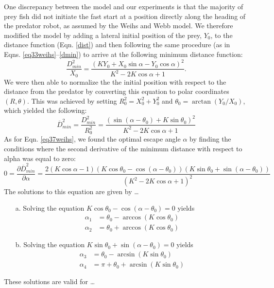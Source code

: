 \documentclass[12pt]{article}
\def\ds{\displaystyle}
\def\d{\partial}
\newcommand{\ol}{\overline}
\begin{document}
One discrepancy between the model and our experiments is that the majority of prey fish did not initiate the fast start at a position directly along the heading of the predator robot, as assumed by the Weihs and Webb model. We therefore modified the model by adding a lateral initial position of the prey, $Y_0$, to the distance function (Eqn. \ref{dist}) and then following the same procedure (as in Eqns. \ref{eq33weihs}--\ref{dmin}) to arrive at the following minimum distance function:
% 
\begin{equation}
\frac{D^2_{min}}{X_0}=\frac{(K Y_0+X_0 \sin \alpha -Y_0\cos \alpha)^2}{K^2-2 K \cos \alpha +1}. 
\label{new_Dmin}
\end{equation}
%
We were then able to normalize the the initial position with respect to the distance from the predator by converting this equation to polar coordinates $(R, \theta)$. This was achieved by setting $R_0^2 = X_0^2 + Y_0^2$ and $\theta_0 = \arctan(Y_0/X_0)$, which yielded the following:
%
\begin{equation}
\ol{D}^2_{min}= \ds\frac{{D}^2_{min}}{R_0^2 }=
\ds\frac{\left ( \sin(\alpha - \theta_0) + K \sin \theta_0 \right )^2}{K^2-2 K \cos \alpha +1} 
\label{Dmin_polar}
\end{equation}
%
As for Eqn. \ref{eq37weihs}, we found the optimal escape angle $\alpha$ by finding the conditions where the second derivative of the minimum distance with respect to alpha was equal to zero:
%
\begin{equation}
0 = \frac{\d \ol{D}^2_{min}}{\d \alpha} = 
\frac{2(K \cos \alpha - 1)(K\cos \theta_0 - \cos(\alpha - \theta_0))(K\sin \theta_0 + \sin(\alpha -\theta_0))}
{(K^2 - 2K \cos \alpha + 1)^2}
\end{equation} 
%
The solutions to this equation are given by \dots
\begin{enumerate}
\item[a.] Solving the equation $K\cos \theta_0 - \cos(\alpha - \theta_0) = 0$ yields
%
\begin{align*}
\alpha_1 & = \theta_0 - \arccos(K \cos \theta_0) \\
\alpha_2 & = \theta_0 + \arccos(K \cos \theta_0)
\end{align*}
%
\item[b.] Solving the equation $K\sin \theta_0 + \sin(\alpha -\theta_0) = 0$ yields
%
\begin{align*}
\alpha_3 & = \theta_0 - \arcsin(K \sin \theta_0) \\
\alpha_4 & = \pi + \theta_0 + \arcsin(K \sin \theta_0)
\end{align*}
%
\end{enumerate}
These solutions are valid for \dots
\end{document}

